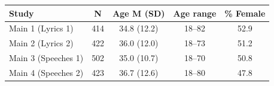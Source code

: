 \begin{table}
\fontsize{12.0pt}{14.4pt}\selectfont
\begin{tabular*}{\linewidth}{@{\extracolsep{\fill}}lcccc}
\toprule
Study & N & Age M (SD) & Age range & \% Female \\ 
\midrule\addlinespace[2.5pt]
Main 1 (Lyrics 1) & 414 & 34.8 (12.2) & 18–82 & 52.9 \\ 
Main 2 (Lyrics 2) & 422 & 36.0 (12.0) & 18–73 & 51.2 \\ 
Main 3 (Speeches 1) & 502 & 35.0 (10.7) & 18–70 & 50.8 \\ 
Main 4 (Speeches 2) & 423 & 36.7 (12.6) & 18–80 & 47.8 \\ 
\bottomrule
\end{tabular*}
\end{table}

